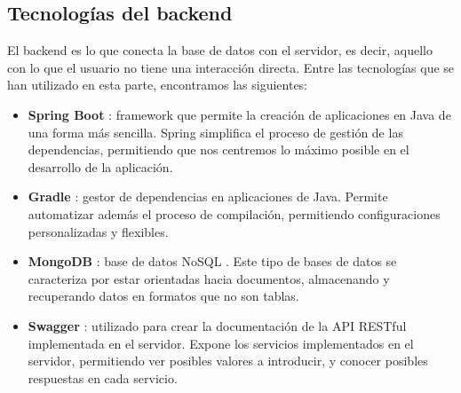 \subsection{Tecnologías del backend}

El backend es lo que conecta la base de datos con el servidor, es decir, aquello con lo que el usuario no tiene una interacción directa. Entre las tecnologías que se han utilizado en esta parte, encontramos las siguientes:

\begin{itemize}
    \item {\bf Spring Boot} \cite{spring}: framework que permite la creación de aplicaciones en Java de una forma más sencilla. Spring simplifica el proceso de gestión de las dependencias, permitiendo que nos centremos lo máximo posible en el desarrollo de la aplicación.
    \item {\bf Gradle} \cite{gradle}: gestor de dependencias en aplicaciones de Java. Permite automatizar además el proceso de compilación, permitiendo configuraciones personalizadas y flexibles.
    \item {\bf MongoDB} \cite{mongodb}: base de datos NoSQL \cite{nosql}. Este tipo de bases de datos se caracteriza por estar orientadas hacia documentos, almacenando y recuperando datos en formatos que no son tablas.
    \item {\bf Swagger} \cite{swagger}: utilizado para crear la documentación de la API RESTful implementada en el servidor. Expone los servicios implementados en el servidor, permitiendo ver posibles valores a introducir, y conocer posibles respuestas en cada servicio.
\end{itemize}